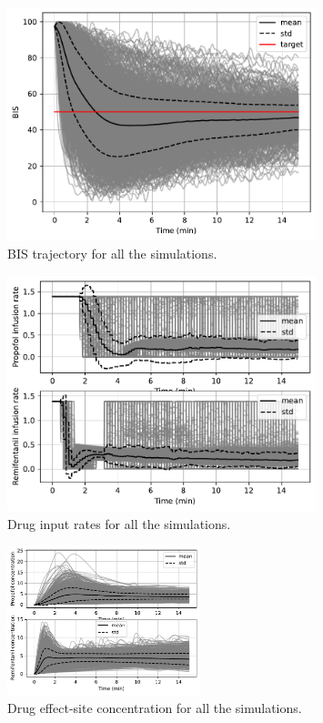 \begin{minipage}[c]{.46\linewidth}
    \begin{figure} [H]
        \centering
        \includegraphics[width=0.8\textwidth]{images/BIS_data.pdf}
        \caption{BIS trajectory for all the simulations.}
        \label{fig:BIS_data}
    \end{figure}
\end{minipage}
\begin{minipage}[c]{.46\linewidth}
    \begin{figure} [H]
        \centering
        \includegraphics[width=0.8\textwidth]{images/input_data.pdf}
        \caption{Drug input rates for all the simulations.}
        \label{fig:input_data}
    \end{figure}
\end{minipage}
\begin{figure} [H]
\centering
\includegraphics[width=0.5\textwidth]{images/concentration_data.pdf}
\caption{Drug effect-site concentration for all the simulations.}
\label{fig:concent_data}
\end{figure}